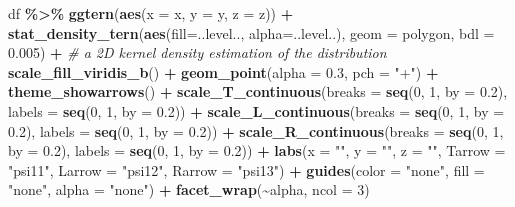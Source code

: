 \documentclass[
  12pt,
]{krantz}
\newenvironment{Shaded}{\begin{snugshade}}{\end{snugshade}}
\newcommand{\AttributeTok}[1]{\textcolor[rgb]{0.13,0.29,0.53}{#1}}
\newcommand{\CommentTok}[1]{\textcolor[rgb]{0.56,0.35,0.01}{\textit{#1}}}
\newcommand{\DecValTok}[1]{\textcolor[rgb]{0.00,0.00,0.81}{#1}}
\newcommand{\FloatTok}[1]{\textcolor[rgb]{0.00,0.00,0.81}{#1}}
\newcommand{\FunctionTok}[1]{\textcolor[rgb]{0.13,0.29,0.53}{\textbf{#1}}}
\newcommand{\NormalTok}[1]{#1}
\newcommand{\SpecialCharTok}[1]{\textcolor[rgb]{0.81,0.36,0.00}{\textbf{#1}}}
\newcommand{\StringTok}[1]{\textcolor[rgb]{0.31,0.60,0.02}{#1}}
\begin{document}
\begin{Shaded}
\begin{Highlighting}[]
\NormalTok{df }\SpecialCharTok{\%\textgreater{}\%}
  \FunctionTok{ggtern}\NormalTok{(}\FunctionTok{aes}\NormalTok{(}\AttributeTok{x =}\NormalTok{ x, }\AttributeTok{y =}\NormalTok{ y, }\AttributeTok{z =}\NormalTok{ z)) }\SpecialCharTok{+}
  \FunctionTok{stat\_density\_tern}\NormalTok{(}\FunctionTok{aes}\NormalTok{(}\AttributeTok{fill=}\NormalTok{..level.., }\AttributeTok{alpha=}\NormalTok{..level..),}
                    \AttributeTok{geom =} \StringTok{\textquotesingle{}polygon\textquotesingle{}}\NormalTok{,}
                    \AttributeTok{bdl =} \FloatTok{0.005}\NormalTok{) }\SpecialCharTok{+} \CommentTok{\# a 2D kernel density estimation of the distribution}
  \FunctionTok{scale\_fill\_viridis\_b}\NormalTok{() }\SpecialCharTok{+}
  \FunctionTok{geom\_point}\NormalTok{(}\AttributeTok{alpha =} \FloatTok{0.3}\NormalTok{, }\AttributeTok{pch =} \StringTok{"+"}\NormalTok{) }\SpecialCharTok{+}
  \FunctionTok{theme\_showarrows}\NormalTok{() }\SpecialCharTok{+}
  \FunctionTok{scale\_T\_continuous}\NormalTok{(}\AttributeTok{breaks =} \FunctionTok{seq}\NormalTok{(}\DecValTok{0}\NormalTok{, }\DecValTok{1}\NormalTok{, }\AttributeTok{by =} \FloatTok{0.2}\NormalTok{),}
                     \AttributeTok{labels =} \FunctionTok{seq}\NormalTok{(}\DecValTok{0}\NormalTok{, }\DecValTok{1}\NormalTok{, }\AttributeTok{by =} \FloatTok{0.2}\NormalTok{)) }\SpecialCharTok{+}
  \FunctionTok{scale\_L\_continuous}\NormalTok{(}\AttributeTok{breaks =} \FunctionTok{seq}\NormalTok{(}\DecValTok{0}\NormalTok{, }\DecValTok{1}\NormalTok{, }\AttributeTok{by =} \FloatTok{0.2}\NormalTok{),}
                     \AttributeTok{labels =} \FunctionTok{seq}\NormalTok{(}\DecValTok{0}\NormalTok{, }\DecValTok{1}\NormalTok{, }\AttributeTok{by =} \FloatTok{0.2}\NormalTok{)) }\SpecialCharTok{+}
  \FunctionTok{scale\_R\_continuous}\NormalTok{(}\AttributeTok{breaks =} \FunctionTok{seq}\NormalTok{(}\DecValTok{0}\NormalTok{, }\DecValTok{1}\NormalTok{, }\AttributeTok{by =} \FloatTok{0.2}\NormalTok{),}
                     \AttributeTok{labels =} \FunctionTok{seq}\NormalTok{(}\DecValTok{0}\NormalTok{, }\DecValTok{1}\NormalTok{, }\AttributeTok{by =} \FloatTok{0.2}\NormalTok{)) }\SpecialCharTok{+}
  \FunctionTok{labs}\NormalTok{(}\AttributeTok{x =} \StringTok{""}\NormalTok{,}
       \AttributeTok{y =} \StringTok{""}\NormalTok{,}
       \AttributeTok{z =} \StringTok{""}\NormalTok{,}
       \AttributeTok{Tarrow =} \StringTok{"psi11"}\NormalTok{,}
       \AttributeTok{Larrow =} \StringTok{"psi12"}\NormalTok{,}
       \AttributeTok{Rarrow =} \StringTok{"psi13"}\NormalTok{) }\SpecialCharTok{+}
  \FunctionTok{guides}\NormalTok{(}\AttributeTok{color =} \StringTok{"none"}\NormalTok{, }\AttributeTok{fill =} \StringTok{"none"}\NormalTok{, }\AttributeTok{alpha =} \StringTok{"none"}\NormalTok{) }\SpecialCharTok{+}
  \FunctionTok{facet\_wrap}\NormalTok{(}\SpecialCharTok{\textasciitilde{}}\NormalTok{alpha, }\AttributeTok{ncol =} \DecValTok{3}\NormalTok{)}
\end{Highlighting}
\end{Shaded}
\end{document}
